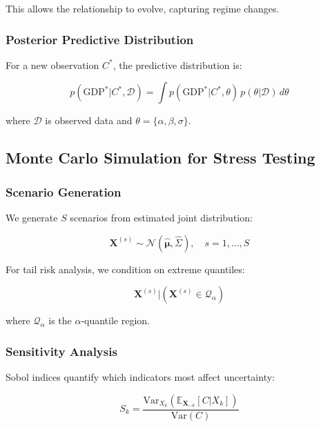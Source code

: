 \documentclass[12pt,a4paper]{article}
\newcommand{\E}{\mathbb{E}}
\newcommand{\Var}{\mathrm{Var}}
\begin{document}
This allows the relationship to evolve, capturing regime changes.

\subsubsection{Posterior Predictive Distribution}

For a new observation $C^*$, the predictive distribution is:

\begin{equation}
    p(\text{GDP}^* | C^*, \mathcal{D}) = \int p(\text{GDP}^* | C^*, \theta) \, p(\theta | \mathcal{D}) \, d\theta
\end{equation}

where $\mathcal{D}$ is observed data and $\theta = \{\alpha, \beta, \sigma\}$.

\subsection{Monte Carlo Simulation for Stress Testing}

\subsubsection{Scenario Generation}

We generate $S$ scenarios from estimated joint distribution:

\begin{equation}
    \mathbf{X}^{(s)} \sim \mathcal{N}(\hat{\boldsymbol{\mu}}, \hat{\Sigma}), \quad s = 1, \ldots, S
\end{equation}

For tail risk analysis, we condition on extreme quantiles:

\begin{equation}
    \mathbf{X}^{(s)} | \left(\mathbf{X}^{(s)} \in \mathcal{Q}_\alpha\right)
\end{equation}

where $\mathcal{Q}_\alpha$ is the $\alpha$-quantile region.

\subsubsection{Sensitivity Analysis}

Sobol indices quantify which indicators most affect uncertainty:

\begin{equation}
    S_k = \frac{\Var_{X_k}\left(\E_{\mathbf{X}_{-k}}[C | X_k]\right)}{\Var(C)}
\end{equation}
\end{document}

